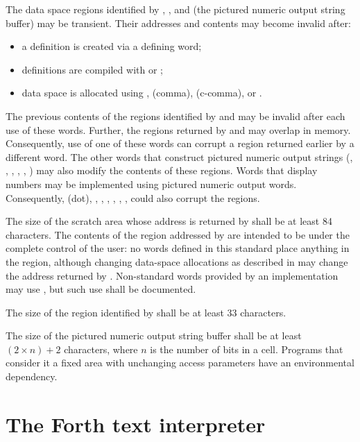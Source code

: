 The data space regions identified by , , and
 (the pictured numeric output string buffer) may be
transient. Their addresses and contents may become invalid after:

\begin{itemize}
\item a definition is created via a defining word;
\item definitions are compiled with \word{:} or ;
\item data space is allocated using , \word{,} (comma),
	 (c-comma), or .
\end{itemize}

The previous contents of the regions identified by  and
 may be invalid after each use of these words. Further,
the regions returned by  and  may overlap in
memory. Consequently, use of one of these words can corrupt a region
returned earlier by a different word. The other words that construct
pictured numeric output strings (, , ,
, , )  may also modify
the contents of these regions. Words that display numbers may be
implemented using pictured numeric output words. Consequently, 
(dot), , , , ,
, ,  could also corrupt the
regions.

The size of the scratch area whose address is returned by 
shall be at least 84 characters. The contents of the region
addressed by  are intended to be under the complete
control of the user: no words defined in this standard place
anything in the region, although changing data-space allocations as
described in  may change
the address returned by . Non-standard words provided by
an implementation may use , but such use shall be
documented.

The size of the region identified by  shall be at least
33 characters.

The size of the pictured numeric output string buffer shall be at
least $(2 \times n) + 2 $ characters, where $n$ is the number of
bits in a cell. Programs that consider it a fixed area with
unchanging access parameters have an environmental dependency.

\section{The Forth text interpreter} %
\label{usage:command}


